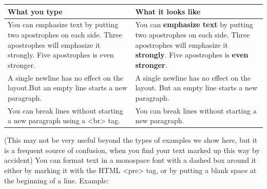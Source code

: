 \documentclass[]{book}
\begin{document}
\begin{longtable}[]{@{}ll@{}}
\toprule
\begin{minipage}[b]{0.45\columnwidth}\raggedright\strut
What you type\strut
\end{minipage} & \begin{minipage}[b]{0.50\columnwidth}\raggedright\strut
What it looks like\strut
\end{minipage}\tabularnewline
\midrule
\endhead
\begin{minipage}[t]{0.45\columnwidth}\raggedright\strut
You can emphasize text by putting two apostrophes on each side. Three
apostrophes will emphasize it strongly. Five apostrophes is even
stronger.\strut
\end{minipage} & \begin{minipage}[t]{0.50\columnwidth}\raggedright\strut
You can \textbf{emphasize text} by putting two apostrophes on each side.
Three apostrophes will emphasize it \textbf{strongly}. Five apostrophes
is \textbf{even stronger}.\strut
\end{minipage}\tabularnewline
\begin{minipage}[t]{0.45\columnwidth}\raggedright\strut
A single newline has no effect on the layout.But an empty line starts a
new paragraph.\strut
\end{minipage} & \begin{minipage}[t]{0.50\columnwidth}\raggedright\strut
A single newline has no effect on the layout. But an empty line starts a
new paragraph.\strut
\end{minipage}\tabularnewline
\begin{minipage}[t]{0.45\columnwidth}\raggedright\strut
You can break lines without starting a new paragraph using a
\textless{}br\textgreater{} tag.\strut
\end{minipage} & \begin{minipage}[t]{0.50\columnwidth}\raggedright\strut
You can break lines without starting a new paragraph.\strut
\end{minipage}\tabularnewline
\bottomrule
\end{longtable}

(This may not be very useful beyond the types of examples we show here,
but it is a frequent source of confusion, when you find your text marked
up this way by accident) You can format text in a monospace font with a
dashed box around it either by marking it with the HTML
\textless{}pre\textgreater{} tag, or by putting a blank space at the
beginning of a line. Example:
\end{document}
